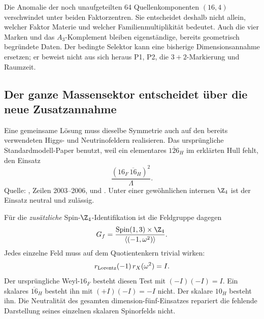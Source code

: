 Die Anomalie der noch unaufgeteilten 64 Quellenkomponenten $(16,4)$ verschwindet unter beiden Faktorzentren. Sie entscheidet deshalb nicht allein, welcher Faktor Materie und welcher Familienmultiplikität bedeutet. Auch die vier Marken und das $A_3$-Komplement bleiben eigenständige, bereits geometrisch begründete Daten. Der bedingte Selektor kann eine bisherige Dimensionsannahme ersetzen; er beweist nicht aus sich heraus P1, P2, die $3+2$-Markierung und Raumzeit.

\subsection{Der ganze Massensektor entscheidet über die neue Zusatzannahme}\label{sec:spinmajorana}
Eine gemeinsame Lösung muss dieselbe Symmetrie auch auf den bereits verwendeten Higgs- und Neutrinofeldern realisieren. Das ursprüngliche Standardmodell-Paper benutzt, weil ein elementares $\overline{126}_H$ im erklärten Hull fehlt, den Einsatz
\begin{equation}
\frac{(16_F\,\overline{16}_H)^2}{\Lambda}.
\end{equation}
Quelle: , Zeilen 2003--2006, und . Unter einer gewöhnlichen internen $\Z_4$ ist der Einsatz neutral und zulässig.

Für die \emph{zusätzliche} Spin-$\Z_4$-Identifikation ist die Feldgruppe dagegen
\begin{equation}
G_f=\frac{\operatorname{Spin}(1,3)\times\Z_4}
 {\langle(-1,\omega^2)\rangle}.
\end{equation}
Jedes einzelne Feld muss auf dem Quotientenkern trivial wirken:
\begin{equation}
r_{\rm Lorentz}(-1)\,r_X(\omega^2)=I.
\end{equation}
Der ursprüngliche Weyl-$16_F$ besteht diesen Test mit $(-I)(-I)=I$. Ein skalares $\overline{16}_H$ besteht ihn mit $(+I)(-I)=-I$ nicht. Der skalare $10_H$ besteht ihn. Die Neutralität des gesamten dimension-fünf-Einsatzes repariert die fehlende Darstellung seines einzelnen skalaren Spinorfelds nicht.


